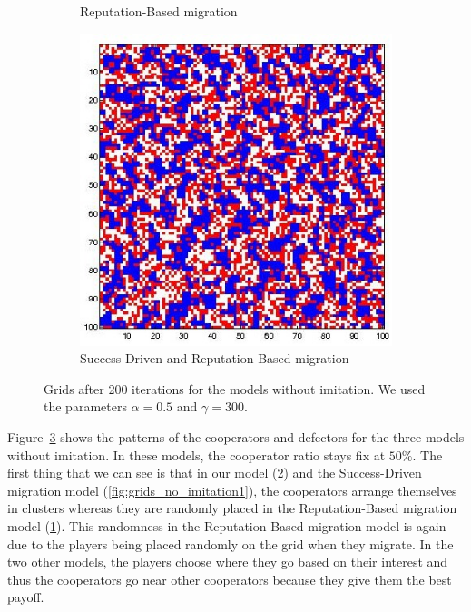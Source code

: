 \documentclass[11pt]{article}
\begin{document}
\begin{figure}[H]
\begin{subfigure}[t]{0.3\textwidth}
	\caption{Reputation-Based migration}
	\label{fig:grids_no_imitation4}
    	\end{subfigure}
	\begin{subfigure}[t]{0.3\textwidth}
        \includegraphics[width=\textwidth]{../../other/grids/m5-t200-a5-g300.jpg}
	\caption{Success-Driven and Reputation-Based migration}
	\label{fig:grids_no_imitation5}
    	\end{subfigure}

	\caption{Grids after 200 iterations for the models without imitation. We used the parameters $\alpha = 0.5$ and $\gamma = 300$.}
	\label{fig:grids_no_imitation}
\end{figure}

Figure~\ref{fig:grids_no_imitation} shows the patterns of the cooperators and defectors for the three models without imitation. In these models, the cooperator ratio stays fix at $50\%$. The first thing that we can see is that in our model (\ref{fig:grids_no_imitation5}) and the Success-Driven migration model (\ref{fig:grids_no_imitation1}), the cooperators arrange themselves in clusters whereas they are randomly placed in the Reputation-Based migration model (\ref{fig:grids_no_imitation4}).
This randomness in the Reputation-Based migration model is again due to the players being placed randomly on the grid when they migrate.
In the two other models, the players choose where they go based on their interest and thus the cooperators go near other cooperators because they give them the best payoff.
\end{document}
